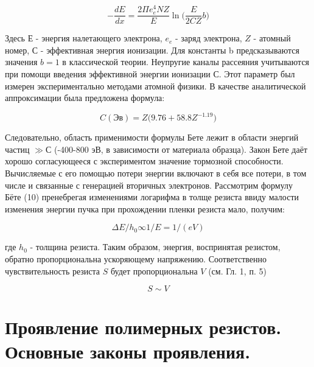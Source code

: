 \begin{equation}
-\frac{dE}{dx}=\frac{2\Pi e_e^4 NZ}{E} \ln {(}\frac{E}{2CZ}b{)}
\label{eq:A10}
\end{equation}

Здесь $Е$ - энергия налетающего электрона, $e_e$ - заряд электрона, $Z$ - атомный номер, $С$ - эффективная энергия ионизации. Для константы b предсказываются значения $b = 1$ в классической теории. Неупругие каналы рассеяния учитываются при помощи введения эффективной энергии ионизации С. Этот параметр был измерен экспериментально методами атомной физики. В качестве аналитической аппроксимации была предложена формула:

\begin{equation}
C(Эв)=Z{(}9.76+58.8Z^{-1.19}{)}
\label{eq:A11}
\end{equation}

Следовательно, область применимости формулы Бете лежит в области энергий частиц $\gg С$  (-400-800 эВ, в зависимости от материала образца). Закон Бете даёт хорошо согласующееся с экспериментом значение тормозной способности. Вычисляемые с его помощью потери энергии включают в себя все потери, в том числе и связанные с генерацией вторичных электронов.
Рассмотрим формулу Бёте (10) пренебрегая изменениями логарифма в толще резиста ввиду малости изменения энергии пучка при прохождении пленки резиста мало, получим:

\begin{equation}
\Delta E/h_0 \infty 1/E= 1/(eV)
\label{eq:A1}
\end{equation}

где $h_0$ - толщина резиста. Таким образом, энергия, воспринятая резистом, обратно пропорциональна ускоряющему напряжению. Соответственно чувствительность резиста $S$ будет пропорциональна $V$ (см. Гл. 1, п. 5)

\begin{equation}
S \sim V
\end{equation}

\section{Проявление полимерных резистов. Основные законы проявления.}

